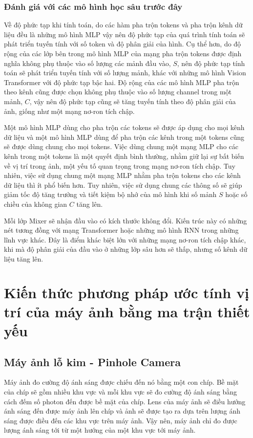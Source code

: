 \subsubsection*{Đánh giá với các mô hình học sâu trước đây}
Về độ phức tạp khi tính toán, do các hàm pha trộn tokens và pha trộn kênh dữ liệu đều là những mô hình MLP vậy nên độ phức tạp của quá trình tính toán sẽ phát triển tuyến tính với số token và độ phân giải của hình. Cụ thể hơn, do độ rộng của các lớp bên trong mô hình MLP của mạng pha trộn tokens được định nghĩa không phụ thuộc vào số lượng các mảnh đầu vào, $S$, nên độ phức tạp tính toán sẽ phát triển tuyến tính với số lượng mảnh, khác với những mô hình Vision Transformer với độ phức tạp bậc hai. Độ rộng của các mô hình MLP pha trộn theo kênh cũng được chọn không phụ thuộc vào số lượng channel trong một mảnh, $C$, vậy nên độ phức tạp cũng sẽ tăng tuyến tính theo độ phân giải của ảnh, giống như một mạng nơ-ron tích chập.

Một mô hình MLP dùng cho pha trộn các tokens sẽ được áp dụng cho mọi kênh dữ liệu và một mô hình MLP dùng để pha trộn các kênh trong một tokens cũng sẽ được dùng chung cho mọi tokens. Việc dùng chung một mạng MLP cho các kênh trong một tokens là một quyết định bình thường, nhằm giữ lại sự bất biến về vị trí trong ảnh, một yếu tố quan trọng trong mạng nơ-ron tích chập. Tuy nhiên, việc sử dụng chung một mạng MLP nhằm pha trộn tokens cho các kênh dữ liệu thì ít phổ biến hơn. Tuy nhiên, việc sử dụng chung các thông số sẽ giúp giảm tốc độ tăng trưởng và tiết kiệm bộ nhớ của mô hình khi số mảnh $S$ hoặc số chiều của không gian $C$ tăng lên.

Mỗi lớp Mixer sẽ nhận đầu vào có kích thước không đổi. Kiến trúc này có những nét tương đồng với mạng Transformer hoặc những mô hình RNN trong những lĩnh vực khác. Đây là điểm khác biệt lớn với những mạng nơ-ron tích chập khác, khi mà độ phân giải của đầu vào ở những lớp sâu hơn sẽ thấp, nhưng số kênh dữ liệu tăng lên.


\section{Kiến thức phương pháp ước tính vị trí của máy ảnh bằng ma trận thiết yếu}
\subsection{Máy ảnh lỗ kim - Pinhole Camera}
Máy ảnh đo cường độ ánh sáng được chiếu đến nó bằng một con chíp. Bề mặt của chíp sẽ gồm nhiều khu vực và mỗi khu vực sẽ đo cường độ ánh sáng bằng cách đếm số photon đến được bề mặt của chíp. Lens của máy ảnh sẽ điều hướng ánh sáng đến được máy ảnh lên chíp và ảnh sẽ được tạo ra dựa trên lượng ánh sáng được điều đến các khu vực trên máy ảnh. Vậy nên, máy ảnh chỉ đo được lượng ánh sáng tới từ một hướng của một khu vực tới máy ảnh.


